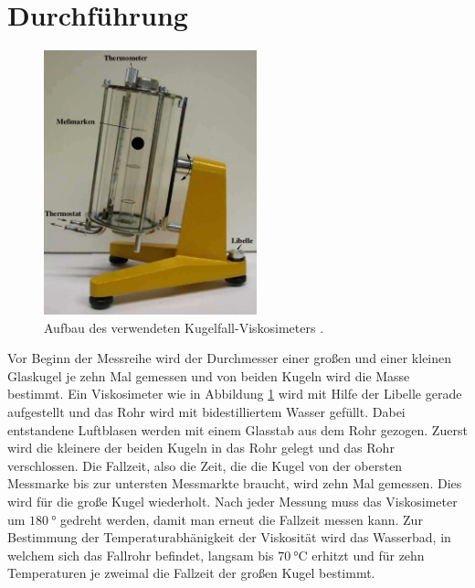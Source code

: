 \section{Durchführung}
\label{sec:Durchführung}
\begin{figure}
  \centering
  \includegraphics[width=0.55\textwidth]{viskosimeter.png}
  \caption{Aufbau des verwendeten Kugelfall-Viskosimeters \cite{sample}.}
  \label{fig:viskosimeter}
\end{figure}
Vor Beginn der Messreihe wird der Durchmesser einer großen und einer kleinen
Glaskugel je zehn Mal gemessen und von beiden Kugeln wird die Masse bestimmt.
Ein Viskosimeter wie in Abbildung \ref{fig:viskosimeter} wird mit Hilfe der
Libelle gerade aufgestellt und das Rohr wird mit bidestilliertem Wasser gefüllt.
Dabei entstandene Luftblasen werden mit einem Glasstab aus dem Rohr gezogen.
Zuerst wird die kleinere der beiden Kugeln in das Rohr gelegt und das Rohr
verschlossen. Die Fallzeit, also die Zeit, die die Kugel von der obersten Messmarke
bis zur untersten Messmarkte braucht, wird zehn Mal gemessen. Dies wird für die
große Kugel wiederholt. Nach jeder Messung muss das Viskosimeter um $\SI{180}
{\degree}$ gedreht werden, damit man erneut die Fallzeit messen kann.\newline
Zur Bestimmung der Temperaturabhänigkeit der Viskosität wird das Wasserbad, in
welchem sich das Fallrohr befindet, langsam bis $\SI{70}{\celsius}$ erhitzt
und für zehn Temperaturen je zweimal die Fallzeit der großen Kugel bestimmt.
